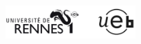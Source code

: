 







\newlength{\plarg}
\setlength{\plarg}{8cm}
\newlength{\glarg}
\setlength{\glarg}{14cm}
\newlength{\Glarg}
\setlength{\Glarg}{15cm}

\begin{titlepage}
\thispagestyle{empty}

\vspace{-1cm}
\begin{minipage}{\glarg}
\vspace{-4.5cm}
\end{minipage}
\vspace{-2cm}
\begin{figure}[htp]
\center
\hspace{-1cm}\includegraphics[angle=0,width=5cm]{Logos.png}
\end{figure}


\end{titlepage}
